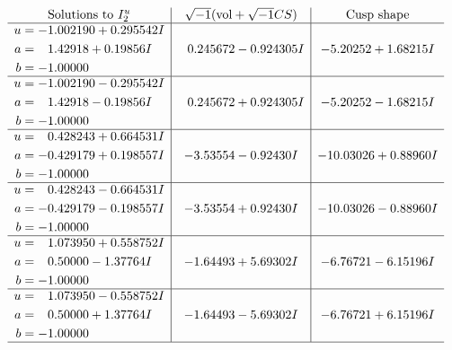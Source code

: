 \documentclass[1p]{elsarticle_modified}
\theoremstyle{definition}
\newcommand{\I}{\sqrt{-1}}
\begin{document}
$$\begin{array}{c|c|c}  
\text{Solutions to }I^u_{2}& \I (\text{vol} + \sqrt{-1}CS) & \text{Cusp shape}\\
 \hline 
\begin{aligned}
u &= -1.002190 + 0.295542 I \\
a &= \phantom{-}1.42918 + 0.19856 I \\
b &= -1.00000\phantom{ +0.000000I}\end{aligned}
 & \phantom{-}0.245672 - 0.924305 I & -5.20252 + 1.68215 I \\ \hline\begin{aligned}
u &= -1.002190 - 0.295542 I \\
a &= \phantom{-}1.42918 - 0.19856 I \\
b &= -1.00000\phantom{ +0.000000I}\end{aligned}
 & \phantom{-}0.245672 + 0.924305 I & -5.20252 - 1.68215 I \\ \hline\begin{aligned}
u &= \phantom{-}0.428243 + 0.664531 I \\
a &= -0.429179 + 0.198557 I \\
b &= -1.00000\phantom{ +0.000000I}\end{aligned}
 & -3.53554 - 0.92430 I & -10.03026 + 0.88960 I \\ \hline\begin{aligned}
u &= \phantom{-}0.428243 - 0.664531 I \\
a &= -0.429179 - 0.198557 I \\
b &= -1.00000\phantom{ +0.000000I}\end{aligned}
 & -3.53554 + 0.92430 I & -10.03026 - 0.88960 I \\ \hline\begin{aligned}
u &= \phantom{-}1.073950 + 0.558752 I \\
a &= \phantom{-}0.50000 - 1.37764 I \\
b &= -1.00000\phantom{ +0.000000I}\end{aligned}
 & -1.64493 + 5.69302 I & -6.76721 - 6.15196 I \\ \hline\begin{aligned}
u &= \phantom{-}1.073950 - 0.558752 I \\
a &= \phantom{-}0.50000 + 1.37764 I \\
b &= -1.00000\phantom{ +0.000000I}\end{aligned}
 & -1.64493 - 5.69302 I & -6.76721 + 6.15196 I\\
 \hline 
 \end{array}$$\newpage
\end{document}
